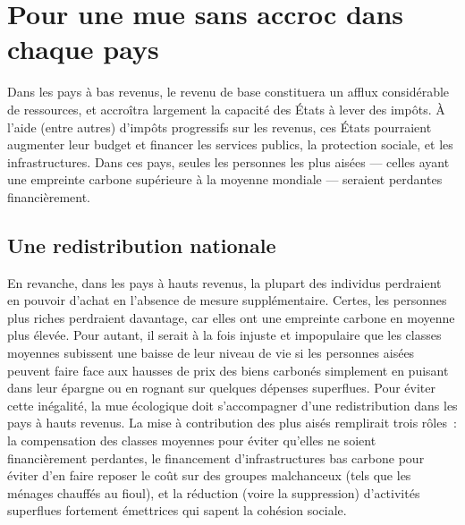 \documentclass[a5paper,french,openany]{memoir}
\begin{document}

\section{Pour une mue sans accroc dans chaque pays}\label{sec:mue_nationale}

Dans les pays à bas revenus, le revenu de base constituera un afflux considérable de ressources, et accroîtra largement la capacité des États à lever des impôts. À l'aide (entre autres) d'impôts progressifs sur les revenus, ces États pourraient augmenter leur budget et financer les services publics, la protection sociale, et les infrastructures. Dans ces pays, seules les personnes les plus aisées --- celles ayant une empreinte carbone supérieure à la moyenne mondiale --- seraient perdantes financièrement. 

\subsection{Une redistribution nationale} %
En revanche, dans les pays à hauts revenus, la plupart des individus perdraient en pouvoir d'achat en l'absence de mesure supplémentaire. Certes, les personnes plus riches perdraient davantage, car elles ont une empreinte carbone en moyenne plus élevée. Pour autant, il serait à la fois injuste et impopulaire que les classes moyennes subissent une baisse de leur niveau de vie si les personnes aisées peuvent faire face aux hausses de prix des biens carbonés simplement en puisant dans leur épargne ou en rognant sur quelques dépenses superflues. Pour éviter cette inégalité, la mue écologique doit s'accompagner d'une redistribution dans les pays à hauts revenus. La mise à contribution des plus aisés remplirait trois rôles~: la compensation des classes moyennes pour éviter qu'elles ne soient financièrement perdantes, le financement d'infrastructures bas carbone pour éviter d'en faire reposer le coût sur des groupes malchanceux (tels que les ménages chauffés au fioul), %
et la réduction (voire la suppression) d'activités superflues fortement émettrices qui sapent la cohésion sociale.
\end{document}
